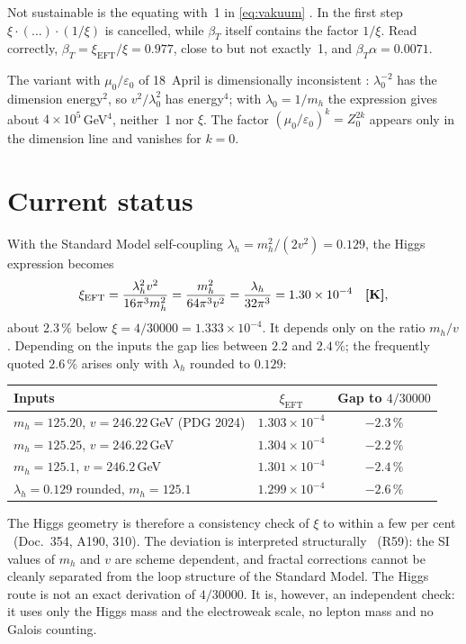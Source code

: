 Not sustainable is the equating with~1 in \eqref{eq:vakuum} \XM. In the first step
$\xi\cdot(\ldots)\cdot(1/\xi)$ is cancelled, while $\beta_T$ itself contains the factor $1/\xi$.
Read correctly, $\beta_T=\xi_{\text{EFT}}/\xi=0.977$, close to but not exactly~1, and
$\beta_T\alpha=0.0071$.

The variant with $\mu_0/\varepsilon_0$ of 18~April is dimensionally inconsistent \XM:
$\lambda_0^{-2}$ has the dimension energy$^2$, so $v^2/\lambda_0^2$ has energy$^4$; with
$\lambda_0=1/m_h$ the expression gives about $4\times10^5$\,GeV$^4$, neither~1 nor $\xi$. The
factor $(\mu_0/\varepsilon_0)^k=Z_0^{2k}$ appears only in the dimension line and vanishes for
$k=0$.

\section{Current status}

With the Standard Model self-coupling $\lambda_h=m_h^2/(2v^2)=0.129$, the Higgs expression becomes
\begin{equation}
  \xi_{\text{EFT}}=\frac{\lambda_h^2v^2}{16\pi^3m_h^2}=\frac{m_h^2}{64\pi^3v^2}
  =\frac{\lambda_h}{32\pi^3}=1.30\times10^{-4}\quad\textbf{[K]} ,
\end{equation}
about $2.3\,\%$ below $\xi=4/30000=1.333\times10^{-4}$. It depends only on the ratio $m_h/v$.
Depending on the inputs the gap lies between $2.2$ and $2.4\,\%$; the frequently quoted $2.6\,\%$
arises only with $\lambda_h$ rounded to $0.129$:
\begin{center}
\small
\begin{tabular}{@{}lcc@{}}
\toprule
\textbf{Inputs} & $\xi_{\text{EFT}}$ & \textbf{Gap to }$4/30000$ \\
\midrule
$m_h=125.20$, $v=246.22$\,GeV (PDG 2024) & $1.303\times10^{-4}$ & $-2.3\,\%$ \\
$m_h=125.25$, $v=246.22$\,GeV & $1.304\times10^{-4}$ & $-2.2\,\%$ \\
$m_h=125.1$, $v=246.2$\,GeV & $1.301\times10^{-4}$ & $-2.4\,\%$ \\
$\lambda_h=0.129$ rounded, $m_h=125.1$ & $1.299\times10^{-4}$ & $-2.6\,\%$ \\
\bottomrule
\end{tabular}
\end{center}
The Higgs geometry is therefore a consistency check of $\xi$ to within a few per cent \KM\
(Doc.~354, A190, 310). The deviation is interpreted structurally \SM\ (R59): the SI values of
$m_h$ and $v$ are scheme dependent, and fractal corrections cannot be cleanly separated from the
loop structure of the Standard Model. The Higgs route is not an exact derivation of $4/30000$. It
is, however, an independent check: it uses only the Higgs mass and the electroweak scale, no lepton
mass and no Galois counting.

